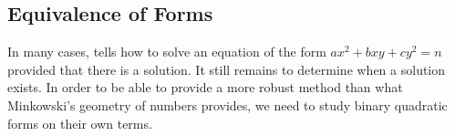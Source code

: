 \documentclass[../notes.tex]{subfiles}
\begin{document}

\subsection{Equivalence of Forms}
In many cases,  tells how to solve an equation of the form $ax^2+bxy+cy^2=n$ provided that there is a solution. It still remains to determine when a solution exists. In order to be able to provide a more robust method than what Minkowski's geometry of numbers provides, we need to study binary quadratic forms on their own terms.
\end{document}
